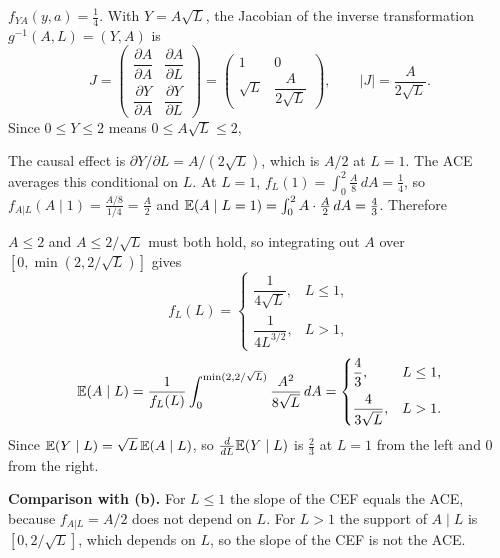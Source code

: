 \documentclass[11pt]{article}
\begin{document}



$f_{YA}(y,a)=\tfrac14$. With $Y=A\sqrt L$, the Jacobian of the inverse transformation $g^{-1}(A,L)=(Y,A)$ is
\[
J=\begin{pmatrix}\dfrac{\partial A}{\partial A} & \dfrac{\partial A}{\partial L}\\[2mm]
\dfrac{\partial Y}{\partial A} & \dfrac{\partial Y}{\partial L}\end{pmatrix}
=\begin{pmatrix}1 & 0\\ \sqrt{L} & \dfrac{A}{2\sqrt{L}}\end{pmatrix},
\qquad |J| = \frac{A}{2\sqrt L}.
\]
Since $0\le Y\le2$ means $0\le A\sqrt L\le2$,

The causal effect is $\partial Y/\partial L=A/(2\sqrt L)$, which is $A/2$ at $L=1$. The ACE averages this conditional on $L$. At $L=1$, $f_L(1)=\int_0^2\frac A8\,dA=\frac14$, so $f_{A|L}(A\mid1)=\frac{A/8}{1/4}=\frac A2$ and $\mathbb{E}(A\mid L=1)=\int_0^2A\cdot\frac A2\,dA=\frac43$. Therefore

$A\le2$ and $A\le2/\sqrt L$ must both hold, so integrating out $A$ over $[0,\min(2,2/\sqrt L)]$ gives
\[
f_L(L)=\begin{cases}\dfrac{1}{4\sqrt L}, & L\le1,\\[3mm] \dfrac{1}{4L^{3/2}}, & L>1,\end{cases}
\]
\[
\mathbb{E}(A\mid L)=\frac1{f_L(L)}\int_0^{\min(2,2/\sqrt L)}\frac{A^2}{8\sqrt L}\,dA=\begin{cases}\dfrac43, & L\le1,\\[3mm]\dfrac{4}{3\sqrt L}, & L>1.\end{cases}
\]
Since $\mathbb{E}(Y\mid L)=\sqrt L\,\mathbb{E}(A\mid L)$,
so $\frac{d}{dL}\mathbb{E}(Y\mid L)$ is $\frac23$ at $L=1$ from the left and $0$ from the right.

\textbf{Comparison with (b).} For $L\le1$ the slope of the CEF equals the ACE, because $f_{A|L}=A/2$ does not depend on $L$. For $L>1$ the support of $A\mid L$ is $[0,2/\sqrt L]$, which depends on $L$, so the slope of the CEF is not the ACE.
\end{document}
